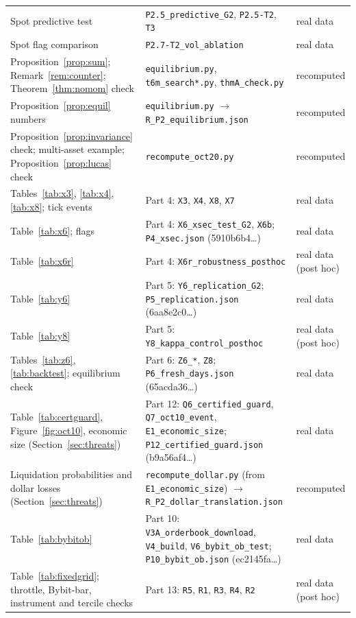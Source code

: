 \documentclass[12pt]{article}
\theoremstyle{definition}
\theoremstyle{remark}
\begin{document}
\begin{longtable}{p{}p{}p{}}
Spot predictive test & \texttt{P2.5\_predictive\_G2}, \texttt{P2.5-T2}, \texttt{T3} & real data\\
Spot flag comparison & \texttt{P2.7-T2\_vol\_ablation} & real data\\
Proposition~\ref{prop:sum}; Remark~\ref{rem:counter}; Theorem~\ref{thm:nomom} check & \texttt{equilibrium.py}, \texttt{t6m\_search*.py}, \texttt{thmA\_check.py} & recomputed\\
Proposition~\ref{prop:equil} numbers & \texttt{equilibrium.py} $\to$ \texttt{R\_P2\_equilibrium.json} & recomputed\\
Proposition~\ref{prop:invariance} check; multi-asset example; Proposition~\ref{prop:lucas} check & \texttt{recompute\_oct20.py} & recomputed\\
Tables~\ref{tab:x3}, \ref{tab:x4}, \ref{tab:x8}; tick events & Part 4: \texttt{X3}, \texttt{X4}, \texttt{X8}, \texttt{X7} & real data\\
Table~\ref{tab:x6}; flags & Part 4: \texttt{X6\_xsec\_test\_G2}, \texttt{X6b}; \texttt{P4\_xsec.json} (5910b6b4\ldots) & real data\\
Table~\ref{tab:x6r} & Part 4: \texttt{X6r\_robustness\_posthoc} & real data (post hoc)\\
Table~\ref{tab:y6} & Part 5: \texttt{Y6\_replication\_G2}; \texttt{P5\_replication.json} (6aa8e2c0\ldots) & real data\\
Table~\ref{tab:y8} & Part 5: \texttt{Y8\_kappa\_control\_posthoc} & real data (post hoc)\\
Tables~\ref{tab:z6}, \ref{tab:backtest}; equilibrium check & Part 6: \texttt{Z6\_*}, \texttt{Z8}; \texttt{P6\_fresh\_days.json} (65acda36\ldots) & real data\\
Table~\ref{tab:certguard}, Figure~\ref{fig:oct10}, economic size (Section~\ref{sec:threats}) & Part 12: \texttt{Q6\_certified\_guard}, \texttt{Q7\_oct10\_event}, \texttt{E1\_economic\_size}; \texttt{P12\_certified\_guard.json} (b9a56af4\ldots) & real data\\
Liquidation probabilities and dollar losses (Section~\ref{sec:threats}) & \texttt{recompute\_dollar.py} (from \texttt{E1\_economic\_size}) $\to$ \texttt{R\_P2\_dollar\_translation.json} & recomputed\\
Table~\ref{tab:bybitob} & Part 10: \texttt{V3A\_orderbook\_download}, \texttt{V4\_build}, \texttt{V6\_bybit\_ob\_test}; \texttt{P10\_bybit\_ob.json} (ec2145fa\ldots) & real data\\
Table~\ref{tab:fixedgrid}; throttle, Bybit-bar, instrument and tercile checks & Part 13: \texttt{R5}, \texttt{R1}, \texttt{R3}, \texttt{R4}, \texttt{R2} & real data (post hoc)\\

\end{longtable}
\end{document}
